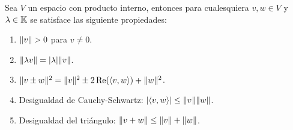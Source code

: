 \begin{teor} \label{teor:propNorm}
  Sea $V$ un espacio con producto interno, entonces para cualesquiera $v,w \in V$ y $\lambda \in \mathbb{K}$ se satisface las siguiente propiedades:
  \begin{enumerate}
    \item $\norm{v}>0$ para $v \neq 0$.
    \item $\mathopen\|\lambda v\mathclose\| = \mathopen|\lambda\mathclose|\mathopen\|v\mathclose\|$.
    \item $\mathopen\|v \pm w\mathclose\|^2 = \mathopen\|v\mathclose\|^2 \pm 2 \operatorname{Re}(\langle v,w\rangle) + \mathopen\|w\mathclose\|^2$.
    \item Desigualdad de Cauchy-Schwartz: $\mathopen|\langle v,w\rangle\mathclose| \leq \mathopen\|v\mathclose\| \mathopen\|w\mathclose\|$.
    \item Desigualdad del triángulo: $\mathopen\|v+w\mathclose\| \leq \mathopen\|v\mathclose\| + \mathopen\|w\mathclose\|$.
  \end{enumerate}
\end{teor}
